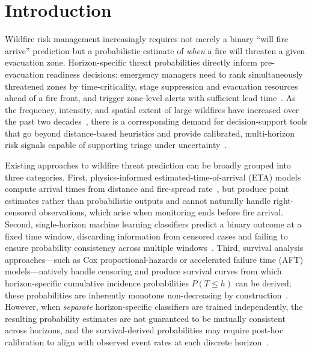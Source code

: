 \documentclass[fire,article,submit,pdftex]{../Definitions/mdpi}
\begin{document}

\section{Introduction}\label{sec:introduction}

Wildfire risk management increasingly requires not merely a binary ``will fire arrive'' prediction but a probabilistic estimate of \emph{when} a fire will threaten a given evacuation zone.
Horizon-specific threat probabilities directly inform pre-evacuation readiness decisions: emergency managers need to rank simultaneously threatened zones by time-criticality, stage suppression and evacuation resources ahead of a fire front, and trigger zone-level alerts with sufficient lead time~\cite{Finney2001,Xi2019,Stephens2018}.
As the frequency, intensity, and spatial extent of large wildfires have increased over the past two decades~\cite{Jain2022,Cunningham2024,Turco2023,Luo2024,Jones2022,Kolden2024,Higuera2021}, there is a corresponding demand for decision-support tools that go beyond distance-based heuristics and provide calibrated, multi-horizon risk signals capable of supporting triage under uncertainty~\cite{Radeloff2023,Tonini2020}.

Existing approaches to wildfire threat prediction can be broadly grouped into three categories.
First, physics-informed estimated-time-of-arrival (ETA) models compute arrival times from distance and fire-spread rate~\cite{Finney2001,Cruz2003}, but produce point estimates rather than probabilistic outputs and cannot naturally handle right-censored observations, which arise when monitoring ends before fire arrival.
Second, single-horizon machine learning classifiers predict a binary outcome at a fixed time window, discarding information from censored cases and failing to ensure probability consistency across multiple windows~\cite{Jaafari2019,Gigovic2019,Chen2024wui}.
Third, survival analysis approaches---such as Cox proportional-hazards or accelerated failure time (AFT) models---natively handle censoring and produce survival curves from which horizon-specific cumulative incidence probabilities $P(T \leq h)$ can be derived; these probabilities are inherently monotone non-decreasing by construction~\cite{Wiegrebe2024,Taylor2013}.
However, when \emph{separate} horizon-specific classifiers are trained independently, the resulting probability estimates are not guaranteed to be mutually consistent across horizons, and the survival-derived probabilities may require post-hoc calibration to align with observed event rates at each discrete horizon~\cite{VanCalster2019}.
\end{document}
